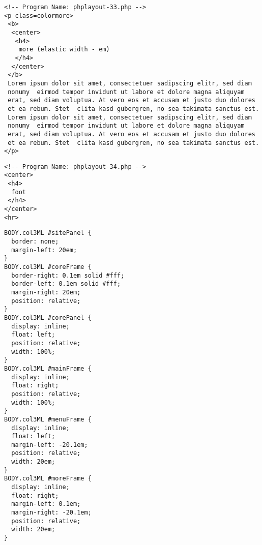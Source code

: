\documentclass[12pt,a4paper,twosides,ngerman]{scrbook}
\begin{document}
\begin{center}
\begin{minipage}[t]{155mm}
\begin{lstlisting}[captionpos=b, caption=Layout - phplayout-33.php]
<!-- Program Name: phplayout-33.php -->
<p class=colormore>
 <b>
  <center>
   <h4>
    more (elastic width - em)
   </h4>
  </center>
 </b>
 Lorem ipsum dolor sit amet, consectetuer sadipscing elitr, sed diam
 nonumy  eirmod tempor invidunt ut labore et dolore magna aliquyam
 erat, sed diam voluptua. At vero eos et accusam et justo duo dolores
 et ea rebum. Stet  clita kasd gubergren, no sea takimata sanctus est.
 Lorem ipsum dolor sit amet, consectetuer sadipscing elitr, sed diam
 nonumy  eirmod tempor invidunt ut labore et dolore magna aliquyam
 erat, sed diam voluptua. At vero eos et accusam et justo duo dolores
 et ea rebum. Stet  clita kasd gubergren, no sea takimata sanctus est.
</p>
\end{lstlisting}
\end{minipage}
\end{center} 
 
\begin{center}
\begin{minipage}[t]{155mm}
\begin{lstlisting}[captionpos=b, caption=Layout - phplayout-34.php]
<!-- Program Name: phplayout-34.php -->
<center>
 <h4>
  foot
 </h4>
</center>
<hr>
\end{lstlisting}
\end{minipage}
\end{center} 


\begin{center}
\begin{minipage}[t]{100mm}
\begin{lstlisting}[captionpos=b, caption=col3ML.css]
BODY.col3ML #sitePanel {
  border: none;
  margin-left: 20em;
}
BODY.col3ML #coreFrame {
  border-right: 0.1em solid #fff;
  border-left: 0.1em solid #fff;
  margin-right: 20em;
  position: relative;
}
BODY.col3ML #corePanel {
  display: inline;
  float: left;
  position: relative;
  width: 100%;
}
BODY.col3ML #mainFrame {
  display: inline;
  float: right;
  position: relative;
  width: 100%;
}
BODY.col3ML #menuFrame {
  display: inline;
  float: left;
  margin-left: -20.1em;
  position: relative;
  width: 20em;
}
BODY.col3ML #moreFrame {
  display: inline;
  float: right;
  margin-left: 0.1em;
  margin-right: -20.1em;
  position: relative;
  width: 20em;
}
\end{lstlisting}
\end{minipage}
\end{center}   
\end{document}
